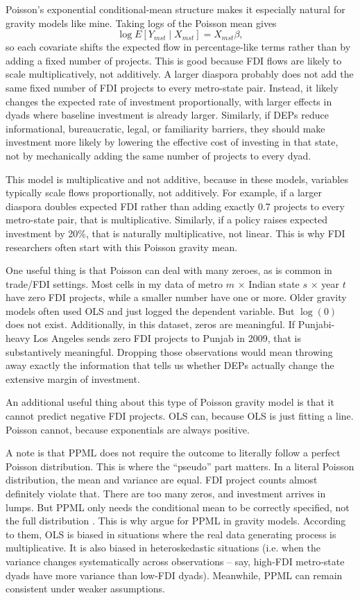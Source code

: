 \documentclass[12pt]{article}
\begin{document}
Poisson's exponential conditional-mean structure makes it especially natural for gravity models like mine. Taking logs of the Poisson mean gives
\[
\log E[Y_{mst} \mid X_{mst}] = X_{mst}\beta,
\]
so each covariate shifts the expected flow in percentage-like terms rather than by adding a fixed number of projects. This is good because FDI flows are likely to scale multiplicatively, not additively. A larger diaspora probably does not add the same fixed number of FDI projects to every metro-state pair. Instead, it likely changes the expected rate of investment proportionally, with larger effects in dyads where baseline investment is already larger. Similarly, if DEPs reduce informational, bureaucratic, legal, or familiarity barriers, they should make investment more likely by lowering the effective cost of investing in that state, not by mechanically adding the same number of projects to every dyad.

    This model is multiplicative and not additive, because in these models, variables typically scale flows proportionally, not additively. For example, if a larger diaspora doubles expected FDI rather than adding exactly 0.7 projects to every metro-state pair, that is multiplicative. Similarly, if a policy raises expected investment by 20\%, that is naturally multiplicative, not linear. This is why FDI researchers often start with this Poisson gravity mean.

    One useful thing is that Poisson can deal with many zeroes, as is common in trade/FDI settings. Most cells in my data of metro $m$ $\times$ Indian state $s$ $\times$ year $t$ have zero FDI projects, while a smaller number have one or more. Older gravity models often used OLS and just logged the dependent variable. But $\log(0)$ does not exist. Additionally, in this dataset, zeros are meaningful. If Punjabi-heavy Los Angeles sends zero FDI projects to Punjab in 2009, that is substantively meaningful. Dropping those observations would mean throwing away exactly the information that tells us whether DEPs actually change the extensive margin of investment.

    An additional useful thing about this type of Poisson gravity model is that it cannot predict negative FDI projects. OLS can, because OLS is just fitting a line. Poisson cannot, because exponentials are always positive. 

    A note is that PPML does not require the outcome to literally follow a perfect Poisson distribution. This is where the ``pseudo'' part matters. In a literal Poisson distribution, the mean and variance are equal. FDI project counts almost definitely violate that. There are too many zeros, and investment arrives in lumps. But PPML only needs the conditional mean to be correctly specified, not the full distribution \citep{gourieroux_pseudo_1984, wooldridge_distribution-free_1999}. This is why \citep{santos_silva_log_2006} argue for PPML in gravity models. According to them, OLS is biased in situations where the real data generating process is multiplicative. It is also biased in heteroskedastic situations (i.e. when the variance changes systematically across observations -- say, high-FDI metro-state dyads have more variance than low-FDI dyads). Meanwhile, PPML can remain consistent under weaker assumptions. 
\end{document}

